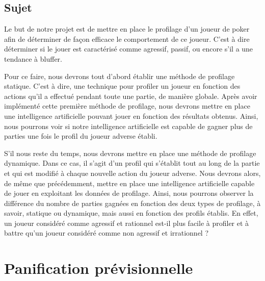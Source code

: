 \documentclass{report}
\begin{document}
\section{Sujet}
\hspace{0.5cm}Le but de notre projet est de mettre en place le profilage d'un joueur de poker afin de déterminer de façon efficace le comportement de ce joueur. C'est à dire déterminer si le jouer est caractérisé comme agressif, passif, ou encore s'il a une tendance à bluffer.\par
Pour ce faire, nous devrons tout d'abord établir une méthode de profilage statique. C'est à dire, une technique pour profiler un joueur en fonction des actions qu'il a effectué pendant toute une partie, de manière globale. Après avoir implémenté cette première méthode de profilage, nous devrons mettre en place une intelligence artificielle pouvant jouer en fonction des résultats obtenus. Ainsi, nous pourrons voir si notre intelligence artificielle est capable de gagner plus de parties une fois le profil du joueur adverse établi.\par
S'il nous reste du temps, nous devrons mettre en place une méthode de profilage dynamique. Dans ce cas, il s'agit d'un profil qui s’établit tout au long de la partie et qui est modifié à chaque nouvelle action du joueur adverse. Nous devrons alors, de même que précédemment, mettre en place une intelligence artificielle capable de jouer en exploitant les données de profilage. Ainsi, nous pourrons observer la différence du nombre de parties gagnées en fonction des deux types de profilage, à savoir, statique ou dynamique, mais aussi en fonction des profils établis. En effet, un joueur considéré comme agressif et rationnel est-il plus facile à profiler et à battre qu'un joueur considéré comme non agressif et irrationnel ?\par

\chapter{Panification prévisionnelle}
\end{document}
